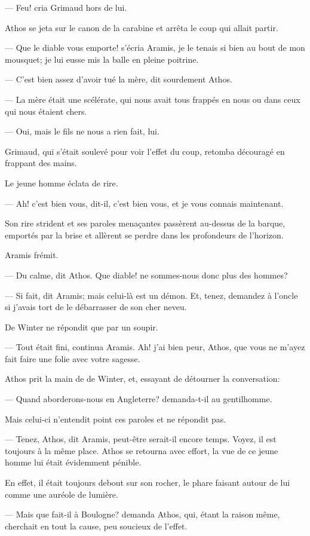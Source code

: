 — Feu! cria Grimaud hors de lui.

Athos se jeta sur le canon de la carabine et arrêta le coup qui allait partir.

— Que le diable vous emporte! s'écria Aramis, je le tenais si bien au bout de mon mousquet; je lui eusse mis la balle en pleine poitrine.

— C'est bien assez d'avoir tué la mère, dit sourdement Athos.

— La mère était une scélérate, qui nous avait tous frappés en nous ou dans ceux qui nous étaient chers.

— Oui, mais le fils ne nous a rien fait, lui.

Grimaud, qui s'était soulevé pour voir l'effet du coup, retomba découragé en frappant des mains.

Le jeune homme éclata de rire.

— Ah! c'est bien vous, dit-il, c'est bien vous, et je vous connais maintenant.

Son rire strident et ses paroles menaçantes passèrent au-dessus de la barque, emportés par la brise et allèrent se perdre dans les profondeurs de l'horizon.

Aramis frémit.

— Du calme, dit Athos. Que diable! ne sommes-nous donc plus des hommes?

— Si fait, dit Aramis; mais celui-là est un démon. Et, tenez, demandez à l'oncle si j'avais tort de le débarrasser de son cher neveu.

De Winter ne répondit que par un soupir.

— Tout était fini, continua Aramis. Ah! j'ai bien peur, Athos, que vous ne m'ayez fait faire une folie avec votre sagesse.

Athos prit la main de de Winter, et, essayant de détourner la conversation:

— Quand aborderons-nous en Angleterre? demanda-t-il au gentilhomme.

Mais celui-ci n'entendit point ces paroles et ne répondit pas.

— Tenez, Athos, dit Aramis, peut-être serait-il encore temps. Voyez, il est toujours à la même place.
Athos se retourna avec effort, la vue de ce jeune homme lui était évidemment pénible.

En effet, il était toujours debout sur son rocher, le phare faisant autour de lui comme une auréole de lumière.

— Mais que fait-il à Boulogne? demanda Athos, qui, étant la raison même, cherchait en tout la cause, peu soucieux de l'effet.

